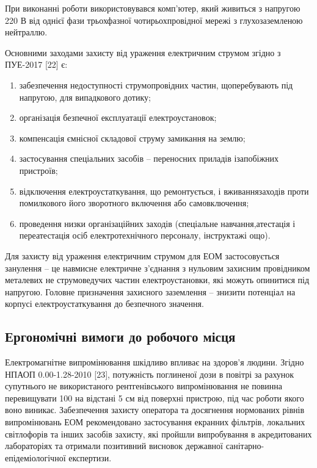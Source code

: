 При виконанні роботи використовувався комп’ютер, який живиться з напругою 220 В від однієї фази трьохфазної чотирьохпровідної мережі з глухозаземленою нейтраллю.

Основними заходами захисту від ураження електричним струмом згідно з ПУЕ-2017 [22] є:

\begin{enumerate}
	\item забезпечення недоступності струмопровідних частин, що\newline \hspace*{-18mm}перебувають під напругою, для випадкового дотику;
	\item організація безпечної експлуатації електроустановок;
	\item компенсація ємнісної складової струму замикання на землю;
	\item застосування спеціальних засобів – переносних приладів і\newline \hspace*{-18mm}запобіжних пристроїв;
	\item відключення електроустаткування, що ремонтується, і вживання\newline \hspace*{-18mm}заходів проти помилкового його зворотного включення або самовключення;
	\item проведення низки організаційних заходів (спеціальне навчання,\newline \hspace*{-18mm}атестація і переатестація осіб електротехнічного персоналу, інструктажі \newline \hspace*{-18mm}ощо).
\end{enumerate}

Для захисту від ураження електричним струмом для ЕОМ застосовується занулення – це навмисне електричне з’єднання з нульовим захисним провідником металевих не струмоведучих частин електроустановки, які можуть опинитися під напругою. Головне призначення захисного заземлення – знизити потенціал на корпусі електроустаткування до безпечного значення.

\subsection{Ергономічні вимоги до робочого місця}

Електромагнітне випромінювання шкідливо впливає на здоров’я людини. Згідно НПАОП 0.00-1.28-2010 [23], потужність поглиненої дози в повітрі за рахунок супутнього не використаного рентгенівського випромінювання не повинна перевищувати 100  на відстані 5 см від поверхні пристрою, під час роботи якого воно виникає. Забезпечення захисту оператора та досягнення нормованих рівнів випромінювань ЕОМ рекомендовано застосування екранних фільтрів, локальних світлофорів та інших засобів захисту, які пройшли випробування в акредитованих лабораторіях та отримали позитивний висновок державної санітарно-епідеміологічної експертизи.

